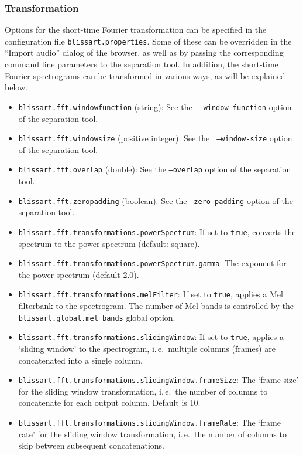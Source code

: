 \subsubsection{Transformation}
\label{section:ConfigFileFFT}

Options for the short-time Fourier transformation can be specified in the
configuration file {\tt blissart.properties}. Some of these can be overridden in the
``Import audio'' dialog of the browser, as well as by passing the corresponding
command line parameters to the separation tool. In addition, the short-time
Fourier spectrograms can be transformed in various ways, as will be explained
below.

\begin{itemize}
  \item {\tt blissart.fft.windowfunction} (string): See the {\tt
      --window-function} option of the separation tool.
  \item {\tt blissart.fft.windowsize} (positive integer): See the {\tt
      --window-size} option of the separation tool.
  \item {\tt blissart.fft.overlap} (double): See the {\tt --overlap} option of
    the separation tool.
  \item {\tt blissart.fft.zeropadding} (boolean): See the {\tt --zero-padding}
    option of the separation tool.
  \item {\tt blissart.fft.transformations.powerSpectrum}: 
        If set to {\tt true}, converts the spectrum to the power spectrum (default: square).
  \item {\tt blissart.fft.transformations.powerSpectrum.gamma}: 
        The exponent for the power spectrum (default 2.0).
  \item {\tt blissart.fft.transformations.melFilter}: 
        If set to {\tt true}, applies a Mel filterbank to the spectrogram.
        The number of Mel bands is controlled by the
        {\tt blissart.global.mel\_bands} global option.
  \item {\tt blissart.fft.transformations.slidingWindow}: 
        If set to {\tt true}, applies a `sliding window' to the spectrogram, i.\,e.\ multiple
        columns (frames) are concatenated into a single column.
  \item {\tt blissart.fft.transformations.slidingWindow.frameSize}: 
        The `frame size' for the sliding window transformation, i.\,e.\ the
        number of columns to concatenate for each output column. Default is 10.
  \item {\tt blissart.fft.transformations.slidingWindow.frameRate}: 
        The `frame rate' for the sliding window transformation, i.\,e.\ the
        number of columns to skip between subsequent concatenations.
\end{itemize}
 
